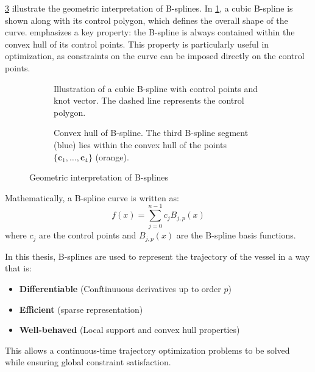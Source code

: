 \cref{fig:b-spline-geometric} illustrate the geometric interpretation of B-splines. In \cref{fig:b-spline-knots-control-points}, a cubic B-spline is shown along with its control polygon, which defines the overall shape of the curve.  emphasizes a key property: the B-spline is always contained within the convex hull of its control points. This property is particularly useful in optimization, as constraints on the curve can be imposed directly on the control points.

\begin{figure}
    \centering
    \begin{subfigure}[b]{0.45\textwidth}
        \centering
        
        \caption{Illustration of a cubic B-spline with control points and knot vector. The dashed line represents the control polygon.}
        \label{fig:b-spline-knots-control-points}
    \end{subfigure}
    \hfill
    \begin{subfigure}[b]{0.45\textwidth}
        \centering
        
        \caption{Convex hull of B-spline. The third B-spline segment (blue) lies within the convex hull of the points $\{\mathbf c_1,\ldots,\mathbf c_4\}$ (orange).}
        \label{fig:b-spline-convex-hull} 
    \end{subfigure}
    \caption{Geometric interpretation of B-splines}
    \label{fig:b-spline-geometric}
\end{figure}

Mathematically, a B-spline curve is written as:
\[
f(x) = \sum_{j=0}^{n-1} c_j B_{j,p}(x)
\]
where \( c_j \) are the control points and \( B_{j,p}(x) \) are the B-spline basis functions.

In this thesis, B-splines are used to represent the trajectory of the vessel in a way that is:
\begin{itemize}
    \item \textbf{Differentiable} (Conftinuuous derivatives up to order \( p \))
    \item \textbf{Efficient} (sparse representation)
    \item \textbf{Well-behaved} (Local support and convex hull properties)
\end{itemize}

This allows a continuous-time trajectory optimization problems to be solved while ensuring global constraint satisfaction. 





